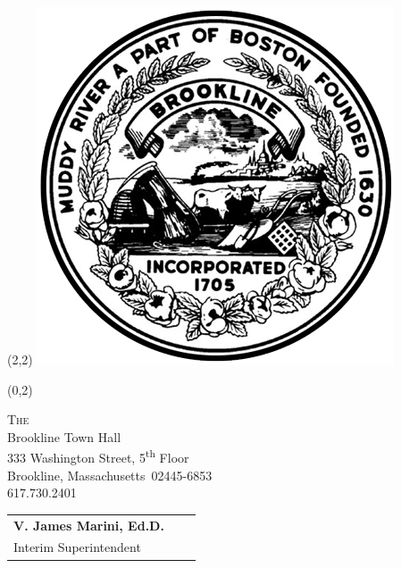 \documentclass[11pt]{article}%
\def\docdate{2020/07/16}%
\def\docschooladdress{Brookline Town Hall\\333 Washington Street, 5\textsuperscript{th} Floor}
\def\docschoolcitystate{Brookline, Massachusetts}
\def\docschoolzip{02445-6853}
\def\docschoolphone{617.730.2401}
\begin{document}
\thispagestyle{first}

\setlength{\TPHorizModule}{.25in}
\setlength{\TPVertModule}{\TPHorizModule}
\textblockorigin{0.25in}{0.25in} %
\setlength{\parindent}{0pt}
\begin{textblock}{32}(2,2)
 \includegraphics*[scale = 0.175]{../images/TownofBrooklineLogo-400x400.png}
\end{textblock}
\begin{textblock}{32}(0,2)
 \begin{minipage}{\linewidth}\centering
  \large\textsc{The \docdistrict} \\
  \normalsize{\docschooladdress} \\
  \normalsize{\docschoolcitystate\ \docschoolzip} \\
  \normalsize{\docschoolphone}
 \end{minipage}
\end{textblock}

\begin{tabularx}{\textwidth}{@{}lXr@{}}\\[1.75cm]
 \normalsize{\bf V. James Marini, Ed.D.} && \large\bf\textit{} \\[-0.5\parskip] %
 \normalsize{Interim Superintendent} && \large\bf\textit{}
\end{tabularx}

\vspace{1cm}%
\end{document}
